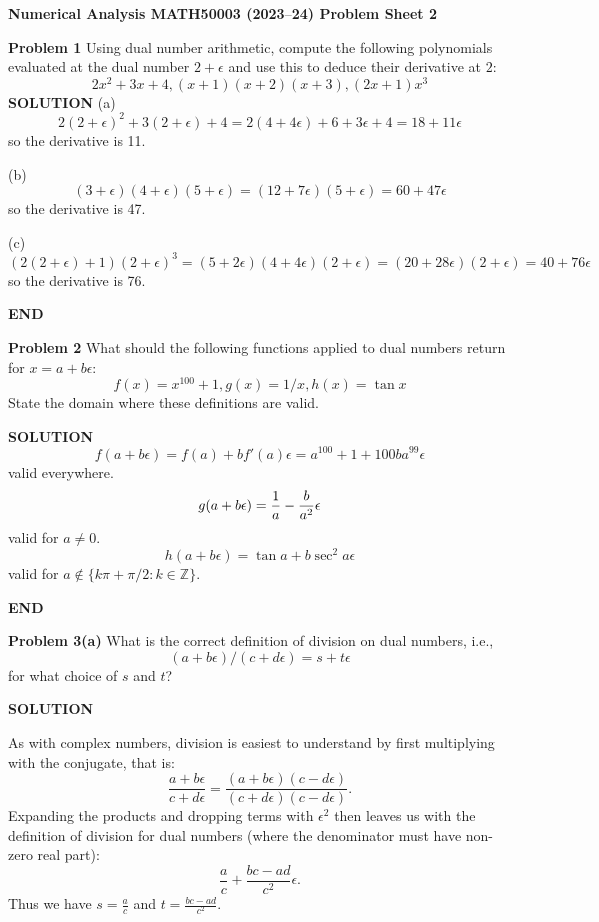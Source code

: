 \documentclass[12pt,a4paper]{article}
\def\endash{–}
\def\bbZ{ {\mathbb Z} }
\begin{document}
\textbf{Numerical Analysis MATH50003 (2023\ensuremath{\endash}24) Problem Sheet 2}

\textbf{Problem 1} Using dual number arithmetic, compute the following polynomials evaluated at the dual number $2+\ensuremath{\epsilon}$ and use this to deduce their derivative at $2$:
\[
2x^2 + 3x + 4, (x+1)(x+2)(x+3), (2x+1)x^3
\]
\textbf{SOLUTION} (a)
\[
2(2+\ensuremath{\epsilon})^2 + 3(2+\ensuremath{\epsilon}) + 4 = 2(4+4\ensuremath{\epsilon}) + 6+3\ensuremath{\epsilon} + 4 = 18 + 11\ensuremath{\epsilon}
\]
so the derivative is 11.

(b) 
\[
(3+\ensuremath{\epsilon})(4+\ensuremath{\epsilon})(5+\ensuremath{\epsilon}) = (12+7\ensuremath{\epsilon})(5+\ensuremath{\epsilon}) = 60+47\ensuremath{\epsilon}
\]
so the derivative is 47.

(c)
\[
(2(2+\ensuremath{\epsilon})+1)(2+\ensuremath{\epsilon})^3 = 
(5+2\ensuremath{\epsilon})(4+4\ensuremath{\epsilon})(2+\ensuremath{\epsilon}) = 
(20 + 28\ensuremath{\epsilon})(2+\ensuremath{\epsilon}) = 40 + 76\ensuremath{\epsilon}
\]
so the derivative is 76.

\textbf{END}

\textbf{Problem 2} What should the following functions applied to dual numbers return for $x = a+b \ensuremath{\epsilon}$:
\[
f(x) = x^{100} + 1, g(x) = 1/x, h(x) = \tan x
\]
State  the domain where these definitions are valid.

\textbf{SOLUTION}
\[
f(a+ b\ensuremath{\epsilon}) = f(a) + b f'(a) \ensuremath{\epsilon} = a^{100} + 1 + 100ba^{99} \ensuremath{\epsilon}
\]
valid everywhere.
\[
g(a+ b\ensuremath{\epsilon}) =  {1 \over a} - {b \over a^2} \ensuremath{\epsilon}
\]
valid for $a \ensuremath{\neq} 0$.
\[
h(a+b\ensuremath{\epsilon}) = \tan a + b \sec^2 a \ensuremath{\epsilon}
\]
valid for $a \ensuremath{\notin} \{ k\ensuremath{\pi}+\ensuremath{\pi}/2 : k \ensuremath{\in} \ensuremath{\bbZ}\}$.

\textbf{END}

\textbf{Problem 3(a)} What is the correct definition of division on dual numbers, i.e.,
\[
(a + b \ensuremath{\epsilon} )/(c + d \ensuremath{\epsilon} ) = s + t \ensuremath{\epsilon}
\]
for what choice of $s$ and $t$? 

\textbf{SOLUTION}

As with complex numbers, division is easiest to understand by first multiplying with the conjugate, that is:
\[
\frac{a+b\ensuremath{\epsilon}}{c+d\ensuremath{\epsilon}} = \frac{(a+b\ensuremath{\epsilon})(c-d\ensuremath{\epsilon})}{(c+d\ensuremath{\epsilon})(c-d\ensuremath{\epsilon})}.
\]
Expanding the products and dropping terms with $\ensuremath{\epsilon}^2$ then leaves us with the definition of division for dual numbers (where the denominator must have non-zero real part):
\[
\frac{a}{c} + \frac{bc - ad}{c^2}\ensuremath{\epsilon}.
\]
Thus we have $s = \frac{a}{c}$ and $t = \frac{bc - ad}{c^2}$.
\end{document}
